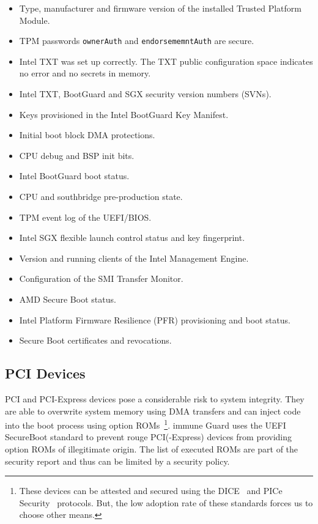 \documentclass[a4paper,oneside,10pt,extrafontsizes]{memoir}
\begin{document}
\begin{itemize}
  \item Type, manufacturer and firmware version of the installed Trusted
    Platform Module.
  \item TPM passwords \texttt{ownerAuth} and \texttt{endorsememntAuth} are
    secure.
  \item Intel TXT was set up correctly. The TXT public configuration space
    indicates no error and no secrets in memory.
  \item Intel TXT, BootGuard and SGX security version numbers (SVNs).
  \item Keys provisioned in the  Intel BootGuard Key Manifest.
  \item Initial boot block DMA protections.
  \item CPU debug and BSP init bits.
  \item Intel BootGuard boot status.
  \item CPU and southbridge pre-production state.
  \item TPM event log of the UEFI/BIOS.
  \item Intel SGX flexible launch control status and key fingerprint.
  \item Version and running clients of the Intel Management Engine.
  \item Configuration of the SMI Transfer Monitor.
  \item AMD Secure Boot status.
  \item Intel Platform Firmware Resilience (PFR) provisioning and boot status.
  \item Secure Boot certificates and revocations.
\end{itemize}

\subsection*{PCI Devices}
PCI and PCI-Express devices pose a considerable risk to system integrity. They
are able to overwrite system memory using DMA transfers and can inject code
into the boot process using option ROMs~\footnote{These devices can be attested
and secured using the DICE~\cite{dice} and PICe Security~\cite{pciesec}
protocols. But, the low adoption rate of these standards forces us to choose
other means.}. immune Guard uses the UEFI SecureBoot standard to prevent rouge
PCI(-Express) devices from providing option ROMs of illegitimate origin. The
list of executed ROMs are part of the security report and thus can be limited
by a security policy.
\end{document}
